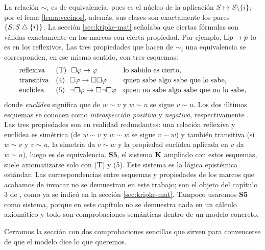 \begin{observacion}\label{obs:s5}
La relación $\sim_i$ es de equivalencia, pues es el núcleo de la aplicación $S \mapsto S \setminus \{i\}$; por el lema \ref{lema:vecinos}, además, sus clases son exactamente los pares $\{S, S \mathbin{\triangle}\{i\}\}$. La sección \ref{sec:kripke-mat} señalaba que ciertas fórmulas son válidas exactamente en los marcos con cierta propiedad. Por ejemplo, $\square p \to p$ lo es en los reflexivos. Las tres propiedades que hacen de $\sim_i$ una equivalencia se corresponden, en ese mismo sentido, con tres esquemas:
\[
  \begin{array}{lll}
    \text{reflexiva}  & \text{(T)}\ \ \square\varphi \to \varphi
                      & \text{lo sabido es cierto,} \\[2pt]
    \text{transitiva} & \text{(4)}\ \ \square\varphi \to \square\square\varphi
                      & \text{quien sabe algo sabe que lo sabe,} \\[2pt]
    \text{euclídea}   & \text{(5)}\ \ \lnot\square\varphi \to \square\lnot\square\varphi
                      & \text{quien no sabe algo sabe que no lo sabe,}
  \end{array}
\]
donde \emph{euclídea} significa que de $w \sim v$ y $w \sim u$ se sigue $v \sim u$. Los dos últimos esquemas se conocen como \emph{introspección positiva} y \emph{negativa}, respectivamente \cite[cap.~3]{fhmv}. Las tres propiedades son en realidad redundantes: una relación reflexiva y euclídea es simétrica (de $w \sim v$ y $w \sim w$ se sigue $v \sim w$) y también transitiva (si $w \sim v$ y $v \sim u$, la simetría da $v \sim w$ y la propiedad euclídea aplicada en $v$ da $w \sim u$), luego es de equivalencia. $\mathbf{S5}$, el sistema $\mathbf{K}$ ampliado con estos esquemas, suele axiomatizarse solo con (T) y (5). Este sistema es la lógica epistémica estándar. Las correspondencias entre esquemas y propiedades de los marcos que acabamos de invocar no se demuestran en este trabajo; son el objeto del capítulo 3 de \cite{blackburn}, como ya se indicó en la sección \ref{sec:kripke-mat}. Tampoco usaremos $\mathbf{S5}$ como sistema, porque en este capítulo no se demuestra nada en un cálculo axiomático y todo son comprobaciones semánticas dentro de un modelo concreto.
\end{observacion}

Cerramos la sección con dos comprobaciones sencillas que sirven para convencerse de que el modelo dice lo que queremos.

